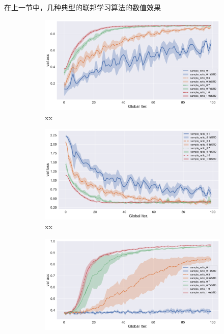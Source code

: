 
在上一节中，几种典型的联邦学习算法的数值效果

\begin{figure}[ht]
\centering
\begin{subfigure}{.5\textwidth}
  \centering
  \includegraphics[width=.95\linewidth]{figures/fedprox-compare-sample-ratio-val-acc.pdf}
  \caption{xx}
  \label{fig:fedprox-compare-sample-ratio-val-acc}
\end{subfigure}%
\begin{subfigure}{.5\textwidth}
  \centering
  \includegraphics[width=.95\linewidth]{figures/fedprox-compare-sample-ratio-val-loss.pdf}
  \caption{xx}
  \label{fig:fedprox-compare-sample-ratio-val-loss}
\end{subfigure}
\begin{subfigure}{.5\textwidth}
  \centering
  \includegraphics[width=.95\linewidth]{figures/proxskip-compare-sample-ratio-val-acc.pdf}

\end{subfigure}
\end{figure}

